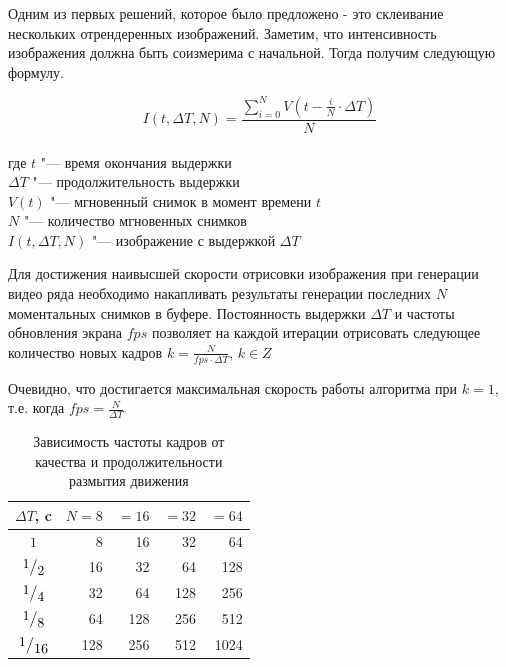 Одним из первых решений, которое было предложено - это склеивание нескольких отрендеренных изображений. \cite{Haeberli90} Заметим, что интенсивность изображения должна быть соизмерима с начальной. Тогда получим следующую формулу.
\begin{eqndesc}
    \begin{equation}\label{F:F202}
        I(t, \Delta T, N) = \frac{ \sum_{i=0}^{N} { V({t - \frac{i}{N} \cdot \Delta T})}}{N}
    \end{equation}
    \\
    где $t$ "--- время окончания выдержки \\
    $\Delta T$ "--- продолжительность выдержки \\
    $V(t)$ "--- мгновенный снимок в момент времени $t$\\
    $N$ "--- количество мгновенных снимков \\
    $I(t, \Delta T, N)$ "--- изображение с выдержкой $\Delta T$
\end{eqndesc}

Для достижения наивысшей скорости отрисовки изображения при генерации видео ряда необходимо накапливать результаты генерации последних $N$ моментальных снимков в буфере. Постоянность выдержки $\Delta T$ и частоты обновления экрана $fps$  позволяет на каждой итерации отрисовать следующее количество новых кадров  $k = \frac{N}{fps \cdot \Delta T}$, $k \in Z$
\par
Очевидно, что достигается максимальная скорость работы алгоритма при $k = 1$, т.е. когда $fps = \frac{N}{\Delta T}$


\begin{table}[ht]
    \caption{Зависимость частоты кадров от качества и продолжительности размытия движения}
    \begin{tabular}{|c|r|r|r|r|}
        \hline
        $\Delta T$, c & $N =8$ & $=16$ & $=32$ & $=64$ \\
        \hline
        $1$           & 8      & 16    & 32    & 64    \\
        $\frc{1}{2}$  & 16     & 32    & 64    & 128   \\
        $\frc{1}{4}$  & 32     & 64    & 128   & 256   \\
        $\frc{1}{8}$  & 64     & 128   & 256   & 512   \\
        $\frc{1}{16}$ & 128    & 256   & 512   & 1024  \\
        \hline
    \end{tabular}
    \label{tab:tabular}
\end{table}


